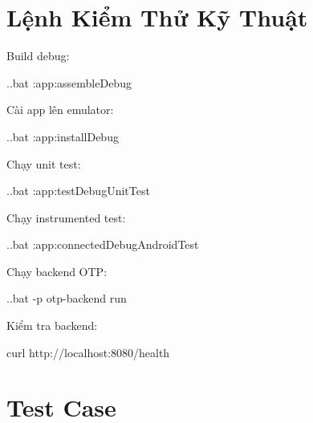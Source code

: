 \documentclass[12pt,a4paper]{report}
\begin{document}
\section{Lệnh Kiểm Thử Kỹ Thuật}

Build debug:

\begin{CodeBlock}
.\gradlew.bat :app:assembleDebug
\end{CodeBlock}

Cài app lên emulator:

\begin{CodeBlock}
.\gradlew.bat :app:installDebug
\end{CodeBlock}

Chạy unit test:

\begin{CodeBlock}
.\gradlew.bat :app:testDebugUnitTest
\end{CodeBlock}

Chạy instrumented test:

\begin{CodeBlock}
.\gradlew.bat :app:connectedDebugAndroidTest
\end{CodeBlock}

Chạy backend OTP:

\begin{CodeBlock}
.\gradlew.bat -p otp-backend run
\end{CodeBlock}

Kiểm tra backend:

\begin{CodeBlock}
curl http://localhost:8080/health
\end{CodeBlock}

\section{Test Case}
\end{document}
